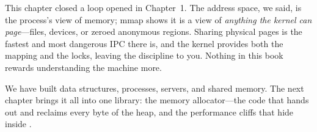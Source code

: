 \begin{osconcept}
This chapter closed a loop opened in Chapter~1. The address space,
we said, is the process's view of memory; mmap shows it is a view of
\emph{anything the kernel can page}---files, devices, or zeroed
anonymous regions. Sharing physical pages is the fastest and most
dangerous IPC there is, and the kernel provides both the mapping and
the locks, leaving the discipline to you. Nothing in this book
rewards understanding the machine more.
\end{osconcept}

We have built data structures, processes, servers, and shared memory.
The next chapter brings it all into one library: the memory
allocator---the code that hands out and reclaims every byte of the
heap, and the performance cliffs that hide inside .

